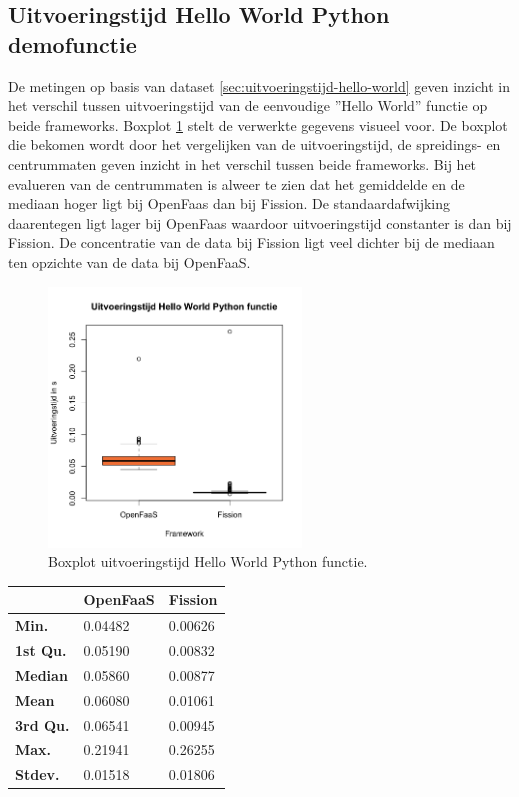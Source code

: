 \subsection{Uitvoeringstijd Hello World Python demofunctie}
De metingen op basis van dataset \ref{sec:uitvoeringstijd-hello-world} geven inzicht in het verschil tussen uitvoeringstijd van de eenvoudige ''Hello World'' functie op beide frameworks. Boxplot \ref{fig:boxplot-hello-functie} stelt de verwerkte gegevens visueel voor.
De boxplot die bekomen wordt door het vergelijken van de uitvoeringstijd, de spreidings- en centrummaten geven inzicht in het verschil tussen beide frameworks. Bij het evalueren van de centrummaten is alweer te zien dat het gemiddelde en de mediaan hoger ligt bij OpenFaas dan bij Fission. De standaardafwijking daarentegen ligt lager bij OpenFaas waardoor uitvoeringstijd constanter is dan bij Fission. De concentratie van de data bij Fission ligt veel dichter bij de mediaan ten opzichte van de data bij OpenFaaS.
\begin{figure}
    \centering
    \includegraphics[width=0.6\textwidth]{img/boxplot-uitvoeringstijd-hellofunctie.png}
    \caption{Boxplot uitvoeringstijd Hello World Python functie.}
    \label{fig:boxplot-hello-functie}
\end{figure}

\begin{tabular}{@{}lll@{}}
    \toprule
    & \textbf{OpenFaaS} & \textbf{Fission} \\ \midrule
    \textbf{Min.} & 0.04482 & 0.00626 \\
    \textbf{1st Qu.} & 0.05190 & 0.00832 \\
    \textbf{Median} & 0.05860 & 0.00877 \\
    \textbf{Mean} & 0.06080 & 0.01061 \\
    \textbf{3rd Qu.} & 0.06541 & 0.00945 \\
    \textbf{Max.} & 0.21941 & 0.26255 \\
    \textbf{Stdev.} & 0.01518 & 0.01806 \\ \bottomrule
\end{tabular}

